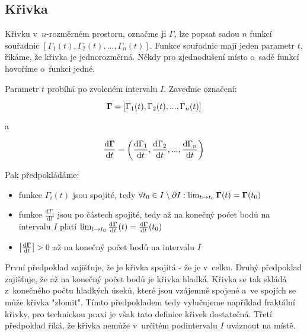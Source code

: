 \subsection{Křivka}

Křivku v~\(n\)-rozměrném prostoru, označme ji \(\Gamma\), lze popsat sadou \(n\) funkcí souřadnic \([\Gamma_1(t), \Gamma_2(t), ..., \Gamma_n(t)]\). Funkce souřadnic mají jeden parametr \(t\), říkáme, že křivka je jednorozměrná. Někdy pro zjednodušení místo o~sadě funkcí hovoříme o~funkci jedné.

Parametr \(t\) probíhá po zvoleném intervalu \(I\). Zaveďme označení:

\begin{equation}
\boldsymbol{\Gamma} = [\Gamma_1(t), \Gamma_2(t), ..., \Gamma_n(t)]
\end{equation}

a

\begin{equation}
\frac{\mathrm{d}\boldsymbol{\Gamma}}{\mathrm{d}t} = \left(\frac{\mathrm{d}\Gamma_1}{\mathrm{d}t}, \frac{\mathrm{d}\Gamma_2}{\mathrm{d}t}, ..., \frac{\mathrm{d}\Gamma_n}{\mathrm{d}t} \right)
\end{equation}

Pak předpokládáme:

\begin{itemize}
\item funkce \(\Gamma_i(t)\) jsou spojité, tedy \(\forall t_0 \in I \setminus \partial I: \lim_{t \to t_0} \boldsymbol{\Gamma}(t) = \boldsymbol{\Gamma}(t_0)\)
\item funkce \(\frac{\mathrm{d}\Gamma_i}{\mathrm{d}t}\) jsou po částech spojité, tedy až na konečný počet bodů na intervalu \(I\) platí \(\lim_{t \to t_0} \frac{\mathrm{d}\boldsymbol{\Gamma}}{\mathrm{d}t}(t) = \frac{\mathrm{d}\boldsymbol{\Gamma}}{\mathrm{d}t}(t_0)\)
\item \(\left|\frac{\mathrm{d}\boldsymbol{\Gamma}}{\mathrm{d}t} \right| > 0\) až na konečný počet bodů na intervalu \(I\)
\end{itemize}

První předpoklad zajišťuje, že je křivka spojitá - že je v~celku. Druhý předpoklad zajišťuje, že až na konečný počet bodů je křivka hladká. Křivka se tak skládá z~konečného počtu hladkých úseků, které jsou vzájemně spojené a~ve spojích se může křivka "zlomit". Tímto předpokladem tedy vylučujeme například fraktální křivky, pro technickou praxi je však tato definice křivek dostatečná. Třetí předpoklad říká, že křivka nemůže v~určitém podintervalu \(I\) uváznout na místě. 

